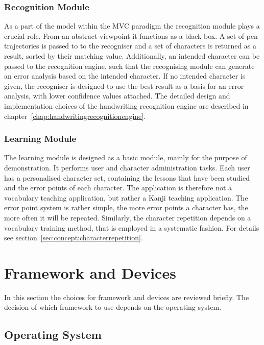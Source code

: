 \subsubsection{Recognition Module}
\label{sec:arch:recognitionmodule}
As a part of the model within the MVC paradigm the recognition module plays
a crucial role. From an abstract viewpoint it functions as a black box.
A set of pen trajectories is passed to to the recogniser and a set of
characters is returned as a result, sorted by their matching value.
Additionally, an intended character can be passed to the recognition engine,
such that the recognising module can generate an error analysis based on the 
intended character. If no intended character is given, the recogniser is designed
to use the best result as a basis for an error analysis, with lower confidence
values attached. The detailed design and implementation choices of the 
handwriting recognition engine are described in 
chapter~\ref{chap:handwritingrecognitionengine}.

\subsubsection{Learning Module}
\label{sec:arch:learningmodule}

The learning module is designed as a basic module, mainly for the purpose of 
demonstration. It performs user and character administration tasks.
Each user has a personalised character set, containing the lessons that have been
studied and the error points of each character.
The application is therefore not a vocabulary teaching application, 
but rather a Kanji teaching application. The error point system is rather simple,
the more error points a character has, the more often it will be repeated.
Similarly, the character repetition depends on a vocabulary training method,
that is employed in a systematic fashion. For details see 
section~\ref{sec:concept:characterrepetition}.

\section{Framework and Devices}
\label{sec:frameworkanddevices}

In this section the choices for framework and devices are reviewed briefly.
The decision of which framework to use depends on the operating system.

\subsection{Operating System}
\label{sec:operatingsystem}

